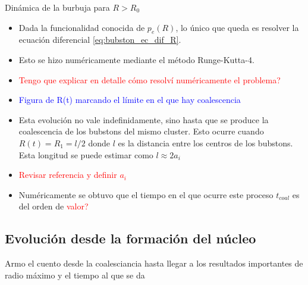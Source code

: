 \documentclass[aps,prb,onecolumn,superscriptaddress,floatfix,longbibliography,10pt]{revtex4-2}
\newcounter{para}
\begin{document}
Dinámica de la burbuja para $R>R_0$
\begin{itemize}
  \item Dada la funcionalidad conocida de $p_e(R)$, lo único que queda es resolver la ecuación diferencial \ref{eq:bubston_ec_dif_R}.
  \item Esto se hizo numéricamente mediante el método Runge-Kutta-4.
  \item \textcolor{red}{Tengo que explicar en detalle cómo resolví numéricamente el problema?}
  \item \textcolor{blue}{Figura de R(t) marcando el límite en el que hay coalescencia}
  \item Esta evolución no vale indefinidamente, sino hasta que se produce la coalescencia de los bubstons del mismo cluster. Esto ocurre cuando $R(t) = R_1=l/2$ donde $l$ es la distancia entre los centros de los bubstons. Esta longitud se puede estimar como $l \approx 2a_i$
  \item \textcolor{red}{Revisar referencia y definir $a_i$}
  \item Numéricamente se obtuvo que el tiempo en el que ocurre este proceso $t_{coal}$ es del orden de \textcolor{red}{valor?}
\end{itemize}

\subsection{Evolución desde la formación del núcleo}

Armo el cuento desde la coalesciancia hasta llegar a los resultados importantes de radio máximo y el tiempo al que se da
\end{document}
